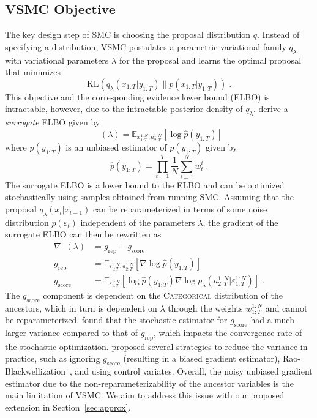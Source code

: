 \documentclass[12pt]{article}
\newcommand{\vsmc}{\textsc{VSMC}\xspace}
\newcommand{\smc}{\textsc{SMC}\xspace}
\newcommand{\elbo}{\textsc{ELBO}\xspace}
\newcommand{\categorical}{\textsc{Categorical}\xspace}
\newcommand{\grep}{g_{\mathrm{rep}}}
\newcommand{\gscore}{g_{\mathrm{score}}}
\DeclareMathOperator{\surrogate}{\tilde{\mathcal{L}}}
\begin{document}
\subsection{\vsmc Objective}

The key design step of \smc is choosing the proposal distribution $q$. Instead of specifying a distribution, \vsmc postulates a parametric variational family $q_\lambda$ with variational parameters $\lambda$ for the proposal and learns the optimal proposal that minimizes
\[
\mathrm{KL}\left(q_\lambda(x_{1:T}|y_{1:T})\| p(x_{1:T}|y_{1:T})\right) \;.
\]
This objective and the corresponding evidence lower bound (\elbo) is intractable, however, due to the intractable posterior density of $q_\lambda$. \textcite{Naesseth:2018} derive a \textit{surrogate} \elbo given by
\[
\surrogate(\lambda) = \mathbb{E}_{x_{1:T}^{1:N},a_{2:T}^{1:N}}\left[\log \hat{p}(y_{1:T})\right]
\]
where $\hat{p}(y_{1:T})$ is an unbiased estimator of $p(y_{1:T})$ given by
\[
\hat{p}(y_{1:T}) = \prod_{t=1}^T\frac{1}{N}\sum_{i=1}^Nw_t^i \;.
\]
The surrogate \elbo is a lower bound to the \elbo and can be optimized stochastically using samples obtained from running \smc. Assuming that the proposal $q_\lambda(x_t|x_{t-1})$ can be reparameterized in terms of some noise distribution $p(\varepsilon_t)$ independent of the parameters $\lambda$, the gradient of the surrogate \elbo can then be rewritten as
\begin{align*}
\nabla\surrogate(\lambda) &= \grep + \gscore \\
\grep &= \mathbb{E}_{\varepsilon_{1:T}^{1:N},a_{2:T}^{1:N}}\left[\nabla\log\hat{p}(y_{1:T})\right] \\
\gscore &= \mathbb{E}_{\varepsilon_{1:T}^{1:N}}\left[\log\hat{p}(y_{1:T})\nabla\log p_\lambda(a_{2:T}^{1:N}|\varepsilon_{1:T}^{1:N}) \right] \;.
\end{align*}
The $\gscore$ component is dependent on the \categorical distribution of the ancestors, which in turn is dependent on $\lambda$ through the weights $w_{1:T}^{1:N}$ and cannot be reparameterized. \textcite{Naesseth:2018} found that the stochastic estimator for $\gscore$ had a much larger variance compared to that of $\grep$, which impacts the convergence rate of the stochastic optimization. \textcite{Naesseth:2018} proposed several strategies to reduce the variance in practice, such as ignoring $\gscore$ (resulting in a biased gradient estimator), Rao-Blackwellization~\parencite{Robert:2021}, and using control variates. Overall, the noisy unbiased gradient estimator due to the non-reparameterizability of the ancestor variables is the main limitation of \vsmc. We aim to address this issue with our proposed extension in Section~\ref{sec:approx}.
\end{document}
